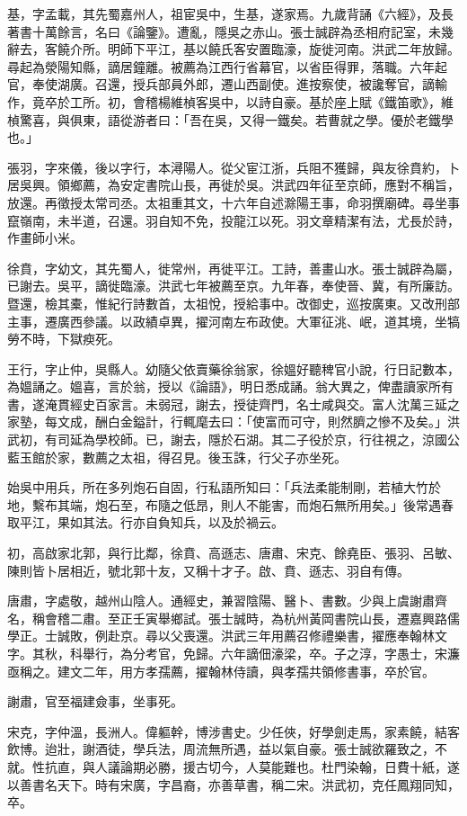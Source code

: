 \begin{pinyinscope}
基，字孟載，其先蜀嘉州人，祖宦吳中，生基，遂家焉。九歲背誦《六經》，及長著書十萬餘言，名曰《論鑒》。遭亂，隱吳之赤山。張士誠辟為丞相府記室，未幾辭去，客饒介所。明師下平江，基以饒氏客安置臨濠，旋徙河南。洪武二年放歸。尋起為滎陽知縣，謫居鐘離。被薦為江西行省幕官，以省臣得罪，落職。六年起官，奉使湖廣。召還，授兵部員外郎，遷山西副使。進按察使，被讒奪官，謫輸作，竟卒於工所。初，會稽楊維楨客吳中，以詩自豪。基於座上賦《鐵笛歌》，維楨驚喜，與俱東，語從游者曰：「吾在吳，又得一鐵矣。若曹就之學。優於老鐵學也。」

張羽，字來儀，後以字行，本潯陽人。從父宦江浙，兵阻不獲歸，與友徐賁約，卜居吳興。領鄉薦，為安定書院山長，再徙於吳。洪武四年征至京師，應對不稱旨，放還。再徵授太常司丞。太祖重其文，十六年自述滁陽王事，命羽撰廟碑。尋坐事竄嶺南，未半道，召還。羽自知不免，投龍江以死。羽文章精潔有法，尤長於詩，作畫師小米。

徐賁，字幼文，其先蜀人，徙常州，再徙平江。工詩，善畫山水。張士誠辟為屬，已謝去。吳平，謫徙臨濠。洪武七年被薦至京。九年春，奉使晉、冀，有所廉訪。暨還，檢其橐，惟紀行詩數首，太祖悅，授給事中。改御史，巡按廣東。又改刑部主事，遷廣西參議。以政績卓異，擢河南左布政使。大軍征洮、岷，道其境，坐犒勞不時，下獄瘐死。

王行，字止仲，吳縣人。幼隨父依賣藥徐翁家，徐媼好聽稗官小說，行日記數本，為媼誦之。媼喜，言於翁，授以《論語》，明日悉成誦。翁大異之，俾盡讀家所有書，遂淹貫經史百家言。未弱冠，謝去，授徒齊門，名士咸與交。富人沈萬三延之家塾，每文成，酬白金鎰計，行輒麾去曰：「使富而可守，則然臍之慘不及矣。」洪武初，有司延為學校師。已，謝去，隱於石湖。其二子役於京，行往視之，涼國公藍玉館於家，數薦之太祖，得召見。後玉誅，行父子亦坐死。

始吳中用兵，所在多列炮石自固，行私語所知曰：「兵法柔能制剛，若植大竹於地，繫布其端，炮石至，布隨之低昂，則人不能害，而炮石無所用矣。」後常遇春取平江，果如其法。行亦自負知兵，以及於禍云。

初，高啟家北郭，與行比鄰，徐賁、高遜志、唐肅、宋克、餘堯臣、張羽、呂敏、陳則皆卜居相近，號北郭十友，又稱十才子。啟、賁、遜志、羽自有傳。

唐肅，字處敬，越州山陰人。通經史，兼習陰陽、醫卜、書數。少與上虞謝肅齊名，稱會稽二肅。至正壬寅舉鄉試。張士誠時，為杭州黃岡書院山長，遷嘉興路儒學正。士誠敗，例赴京。尋以父喪還。洪武三年用薦召修禮樂書，擢應奉翰林文字。其秋，科舉行，為分考官，免歸。六年謫佃濠梁，卒。子之淳，字愚士，宋濂亟稱之。建文二年，用方孝孺薦，擢翰林侍讀，與孝孺共領修書事，卒於官。

謝肅，官至福建僉事，坐事死。

宋克，字仲溫，長洲人。偉軀幹，博涉書史。少任俠，好學劍走馬，家素饒，結客飲博。迨壯，謝酒徒，學兵法，周流無所遇，益以氣自豪。張士誠欲羅致之，不就。性抗直，與人議論期必勝，援古切今，人莫能難也。杜門染翰，日費十紙，遂以善書名天下。時有宋廣，字昌裔，亦善草書，稱二宋。洪武初，克任鳳翔同知，卒。


\end{pinyinscope}
